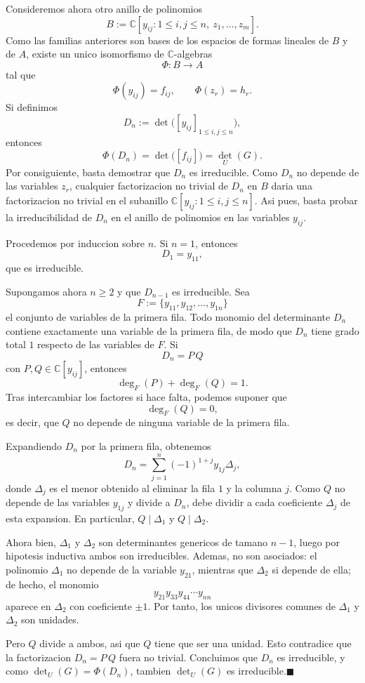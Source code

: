 \documentclass[10pt,a4paper]{article}
\newcommand{\CC}{\mathbb{C}}
\begin{document}
Consideremos ahora otro anillo de polinomios
\[
  B:=\CC[y_{ij}:1\le i,j\le n,\ z_1,\dots,z_m].
\]
Como las familias anteriores son bases de los espacios de formas lineales de
$B$ y de $A$, existe un unico isomorfismo de $\CC$-algebras
\[
  \Phi:B\longrightarrow A
\]
tal que
\[
  \Phi(y_{ij})=f_{ij},
  \qquad
  \Phi(z_r)=h_r.
\]
Si definimos
\[
  D_n:=\det\bigl([y_{ij}]_{1\le i,j\le n}\bigr),
\]
entonces
\[
  \Phi(D_n)=\det\bigl([f_{ij}]\bigr)=\det_U(G).
\]
Por consiguiente, basta demostrar que $D_n$ es irreducible. Como $D_n$ no
depende de las variables $z_r$, cualquier factorizacion no trivial de $D_n$ en
$B$ daria una factorizacion no trivial en el subanillo
$\CC[y_{ij}:1\le i,j\le n]$. Asi pues, basta probar la irreducibilidad de
$D_n$ en el anillo de polinomios en las variables $y_{ij}$.

Procedemos por induccion sobre $n$. Si $n=1$, entonces
\[
  D_1=y_{11},
\]
que es irreducible.

Supongamos ahora $n\ge 2$ y que $D_{n-1}$ es irreducible. Sea
\[
  F:=\{y_{11},y_{12},\dots,y_{1n}\}
\]
el conjunto de variables de la primera fila. Todo monomio del determinante
$D_n$ contiene exactamente una variable de la primera fila, de modo que $D_n$
tiene grado total $1$ respecto de las variables de $F$. Si
\[
  D_n=P\,Q
\]
con $P,Q\in\CC[y_{ij}]$, entonces
\[
  \deg_F(P)+\deg_F(Q)=1.
\]
Tras intercambiar los factores si hace falta, podemos suponer que
\[
  \deg_F(Q)=0,
\]
es decir, que $Q$ no depende de ninguna variable de la primera fila.

Expandiendo $D_n$ por la primera fila, obtenemos
\[
  D_n=\sum_{j=1}^n (-1)^{1+j} y_{1j}\Delta_j,
\]
donde $\Delta_j$ es el menor obtenido al eliminar la fila $1$ y la columna
$j$. Como $Q$ no depende de las variables $y_{1j}$ y divide a $D_n$, debe
dividir a cada coeficiente $\Delta_j$ de esta expansion. En particular,
$Q\mid\Delta_1$ y $Q\mid\Delta_2$.

Ahora bien, $\Delta_1$ y $\Delta_2$ son determinantes genericos de tamano
$n-1$, luego por hipotesis inductiva ambos son irreducibles. Ademas, no son
asociados: el polinomio $\Delta_1$ no depende de la variable $y_{21}$, mientras
que $\Delta_2$ si depende de ella; de hecho, el monomio
\[
  y_{21}y_{33}y_{44}\cdots y_{nn}
\]
aparece en $\Delta_2$ con coeficiente $\pm1$. Por tanto, los unicos divisores
comunes de $\Delta_1$ y $\Delta_2$ son unidades.

Pero $Q$ divide a ambos, asi que $Q$ tiene que ser una unidad. Esto contradice
que la factorizacion $D_n=P\,Q$ fuera no trivial. Concluimos que $D_n$ es
irreducible, y como $\det_U(G)=\Phi(D_n)$, tambien $\det_U(G)$ es
irreducible.\hfill$\blacksquare$
\end{document}

